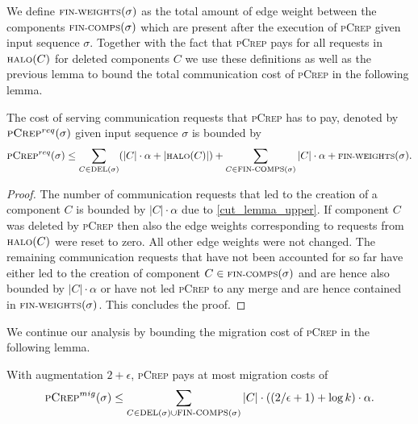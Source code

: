 \documentclass[a4paper,UKenglish,cleveref, autoref, thm-restate,authorcolumns]{../lipics/lipics-v2019}
\newcommand{\adjDel}{\textsc{pCrep}}
\newcommand{\del}{\text{\scriptsize DEL}}
\newcommand{\halo}{\text{\scriptsize HALO}}
\newcommand{\finalComps}{\text{\scriptsize FIN-COMPS}}
\newcommand{\finalWeights}{\text{\scriptsize FIN-WEIGHTS}}
\begin{document}
We define $\finalWeights{}(\sigma)$ as the total amount of edge weight between the components $\finalComps{}(\sigma)$ which are present after the execution of \adjDel{} given input sequence $\sigma$.
Together with the fact that \adjDel{} pays for all requests in $\halo(C)$ for deleted components $C$ we use these definitions as well as the previous lemma to bound the total communication cost of \adjDel{} in the following lemma.

\begin{lemma}
	\label{crep_req_bound}
	The cost of serving communication requests that \adjDel{} has to pay, denoted by $\adjDel{}^{req}(\sigma)$ given input sequence $\sigma$ is bounded by
	\begin{align*}
	\adjDel{}^{req}(\sigma)\leq\sum_{C\in\del{}(\sigma)}(|C|\cdot\alpha+|\halo(C)|)+\sum_{C\in \finalComps(\sigma)}|C|\cdot\alpha+\finalWeights(\sigma).
	\end{align*}
\end{lemma}

\begin{proof}
	The number of communication requests that led to the creation of a component $C$ is bounded by $|C|\cdot\alpha$ due to \cref{cut_lemma_upper}.
	If component $C$ was deleted by \adjDel{} then also the edge weights corresponding to requests from $\halo(C)$ were reset to zero. All other edge weights were not changed. The remaining communication requests that have not been accounted for so far have either led to the creation of component $C\in\finalComps(\sigma)$ and are hence also bounded by $|C|\cdot\alpha$ or have not led \adjDel{} to any merge and are hence contained in $\finalWeights(\sigma)$. This concludes the proof.
\end{proof}

We continue our analysis by bounding the migration cost of \adjDel{} in the following lemma.

\begin{lemma}
	\label{crep_mig_bound}
	With augmentation $2+\epsilon$, \adjDel{} pays at most migration costs of
	\begin{align*}
	\adjDel^{mig}(\sigma)\leq\sum_{C\in\del{}(\sigma)\cup\finalComps(\sigma)}|C|\cdot((2/\epsilon+1)+\log k)\cdot\alpha.
	\end{align*}
\end{lemma}
\end{document}
